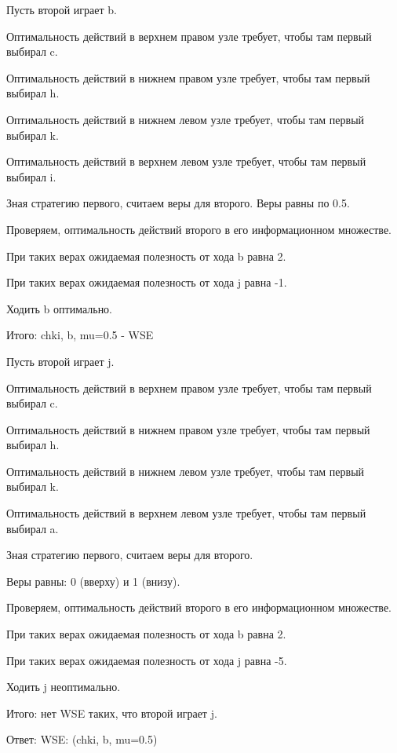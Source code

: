 {Пусть второй играет b. \par
Оптимальность действий в верхнем правом узле требует, чтобы там первый выбирал c.\par
Оптимальность действий в нижнем правом узле требует, чтобы там первый выбирал h.\par
Оптимальность действий в нижнем левом узле требует, чтобы там первый выбирал k.\par
Оптимальность действий в верхнем левом узле требует, чтобы там первый выбирал i.\par
Зная стратегию первого, считаем веры для второго. Веры равны по 0.5.\par
Проверяем, оптимальность действий второго в его информационном множестве.\par
При таких верах ожидаемая полезность от хода b равна 2.\par
При таких верах ожидаемая полезность от хода j равна -1.\par
Ходить b оптимально.\par
Итого: chki, b, mu=0.5 - WSE\par
Пусть второй играет j. \par
Оптимальность действий в верхнем правом узле требует, чтобы там первый выбирал c.\par
Оптимальность действий в нижнем правом узле требует, чтобы там первый выбирал h.\par
Оптимальность действий в нижнем левом узле требует, чтобы там первый выбирал k.\par
Оптимальность действий в верхнем левом узле требует, чтобы там первый выбирал a.\par
Зная стратегию первого, считаем веры для второго. \par
Веры равны: 0 (вверху) и 1 (внизу).\par
Проверяем, оптимальность действий второго в его информационном множестве.\par
При таких верах ожидаемая полезность от хода b равна 2.\par
При таких верах ожидаемая полезность от хода j равна -5.\par
Ходить j неоптимально.\par
Итого: нет WSE таких, что второй играет j.\par
Ответ: WSE: (chki, b, mu=0.5)}


 \solution{} 



